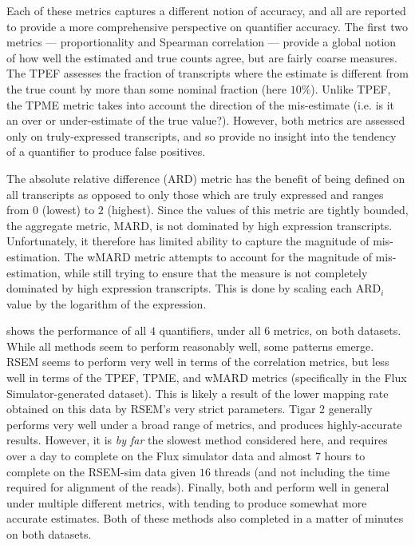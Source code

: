 Each of these metrics captures a different notion of accuracy, and all are reported to provide a more comprehensive perspective on quantifier accuracy.  The first two metrics --- proportionality and Spearman correlation --- provide a global notion of how well the estimated and true counts agree, but are fairly coarse measures. The TPEF assesses the fraction of transcripts where the estimate is different from the true count by more than some nominal fraction (here $10\%$).  Unlike TPEF, the TPME metric takes into account the direction of the mis-estimate (i.e. is it an over or under-estimate of the true value?).  However, both metrics are assessed only on truly-expressed transcripts, and so provide no insight into the tendency of a quantifier to produce false positives.

The absolute relative difference (ARD) metric has the benefit of being defined on all transcripts as opposed to only those which are truly expressed and ranges from $0$ (lowest) to $2$ (highest).  Since the values of this metric are tightly bounded, the aggregate metric, MARD, is not dominated by high expression transcripts.  Unfortunately, it therefore has limited ability to capture the magnitude of  mis-estimation.  The wMARD metric attempts to account for the magnitude of mis-estimation, while still trying to ensure that the measure is not completely dominated by high expression transcripts.  This is done by scaling each ARD$_i$ value by the logarithm of the expression.

 shows the performance of all $4$ quantifiers, under all $6$ metrics, on both datasets.  While all methods seem to perform reasonably well, some patterns emerge.  RSEM seems to perform very well in terms of the correlation metrics, but less well in terms of the TPEF, TPME, and wMARD metrics (specifically in the Flux Simulator-generated dataset).  This is likely a result of the lower mapping rate obtained on this data by RSEM's very strict \bt parameters.  Tigar 2 generally performs very well under a broad range of metrics, and produces highly-accurate results.  However, it is \textit{by far} the slowest method considered here, and requires over a day to complete on the Flux simulator data and almost 7 hours to complete on the RSEM-sim data given $16$ threads (and not including the time required for \bt alignment of the reads).  Finally, both \quasiSF and \kallisto perform well in general under multiple different metrics, with \quasiSF tending to produce somewhat more accurate estimates.  Both of these methods also completed
in a matter of minutes on both datasets.

